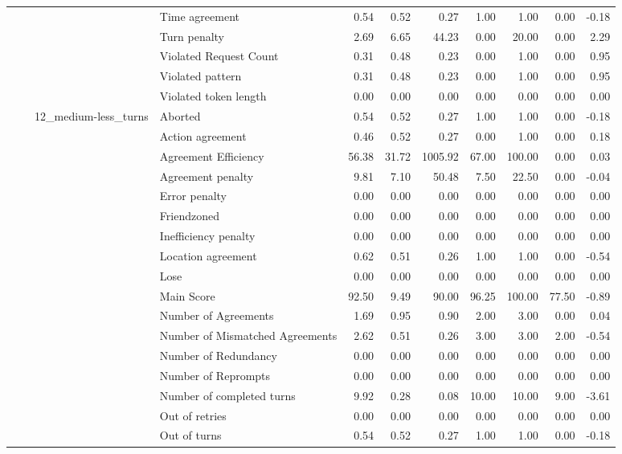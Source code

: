 \begin{tabular}{llllrrrrrrr}
 &  &  & Time agreement & 0.54 & 0.52 & 0.27 & 1.00 & 1.00 & 0.00 & -0.18 \\
 &  &  & Turn penalty & 2.69 & 6.65 & 44.23 & 0.00 & 20.00 & 0.00 & 2.29 \\
 &  &  & Violated Request Count & 0.31 & 0.48 & 0.23 & 0.00 & 1.00 & 0.00 & 0.95 \\
 &  &  & Violated pattern & 0.31 & 0.48 & 0.23 & 0.00 & 1.00 & 0.00 & 0.95 \\
 &  &  & Violated token length & 0.00 & 0.00 & 0.00 & 0.00 & 0.00 & 0.00 & 0.00 \\
\cline{3-11}
 &  & \multirow[t]{27}{*}{12_medium-less_turns} & Aborted & 0.54 & 0.52 & 0.27 & 1.00 & 1.00 & 0.00 & -0.18 \\
 &  &  & Action agreement & 0.46 & 0.52 & 0.27 & 0.00 & 1.00 & 0.00 & 0.18 \\
 &  &  & Agreement Efficiency & 56.38 & 31.72 & 1005.92 & 67.00 & 100.00 & 0.00 & 0.03 \\
 &  &  & Agreement penalty & 9.81 & 7.10 & 50.48 & 7.50 & 22.50 & 0.00 & -0.04 \\
 &  &  & Error penalty & 0.00 & 0.00 & 0.00 & 0.00 & 0.00 & 0.00 & 0.00 \\
 &  &  & Friendzoned & 0.00 & 0.00 & 0.00 & 0.00 & 0.00 & 0.00 & 0.00 \\
 &  &  & Inefficiency penalty & 0.00 & 0.00 & 0.00 & 0.00 & 0.00 & 0.00 & 0.00 \\
 &  &  & Location agreement & 0.62 & 0.51 & 0.26 & 1.00 & 1.00 & 0.00 & -0.54 \\
 &  &  & Lose & 0.00 & 0.00 & 0.00 & 0.00 & 0.00 & 0.00 & 0.00 \\
 &  &  & Main Score & 92.50 & 9.49 & 90.00 & 96.25 & 100.00 & 77.50 & -0.89 \\
 &  &  & Number of Agreements & 1.69 & 0.95 & 0.90 & 2.00 & 3.00 & 0.00 & 0.04 \\
 &  &  & Number of Mismatched Agreements & 2.62 & 0.51 & 0.26 & 3.00 & 3.00 & 2.00 & -0.54 \\
 &  &  & Number of Redundancy & 0.00 & 0.00 & 0.00 & 0.00 & 0.00 & 0.00 & 0.00 \\
 &  &  & Number of Reprompts & 0.00 & 0.00 & 0.00 & 0.00 & 0.00 & 0.00 & 0.00 \\
 &  &  & Number of completed turns & 9.92 & 0.28 & 0.08 & 10.00 & 10.00 & 9.00 & -3.61 \\
 &  &  & Out of retries & 0.00 & 0.00 & 0.00 & 0.00 & 0.00 & 0.00 & 0.00 \\
 &  &  & Out of turns & 0.54 & 0.52 & 0.27 & 1.00 & 1.00 & 0.00 & -0.18 \\

\end{tabular}
